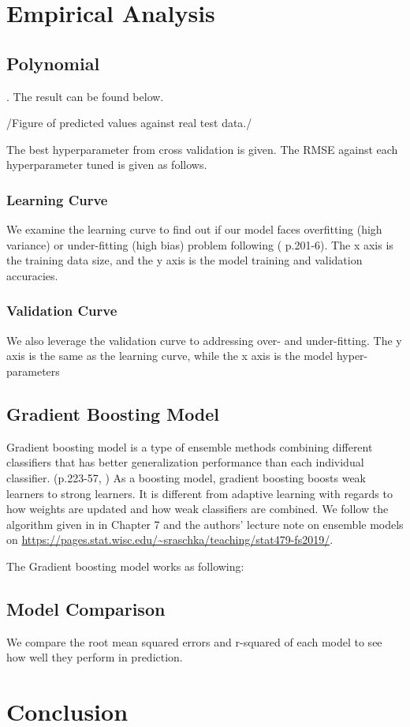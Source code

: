 \documentclass[12pt]{article} %
\begin{document}
\section{Empirical Analysis}
	\subsection{Polynomial}
		.  The result can be found below.
		
		/Figure of predicted values against real test data./
		
		The best hyperparameter from cross validation is given. The RMSE against each hyperparameter tuned is given as follows.
		\subsubsection{Learning Curve}
			We examine the learning curve to find out if our model faces overfitting (high variance) or under-fitting (high bias) problem following (\cite{Raschka2019} p.201-6). The x axis is the training data size, and the y axis is the model training and validation accuracies.
		\subsubsection{Validation Curve}
			We also leverage the validation curve to addressing over- and under-fitting. The y axis is the same as the learning curve, while the x axis is the model hyper-parameters
	\subsection{Gradient Boosting Model}
		Gradient boosting model is a type of ensemble methods combining different classifiers that has better generalization performance than each individual classifier. (p.223-57, \cite{Raschka2019}) As a boosting model, gradient boosting boosts weak learners to strong learners. It is different from adaptive learning with regards to how weights are updated and how weak classifiers are combined. We follow the algorithm given in \cite{raschka2019} in Chapter 7 and the authors' lecture note on ensemble models on \url{https://pages.stat.wisc.edu/~sraschka/teaching/stat479-fs2019/}.\par
		The Gradient boosting model works as following:
	\subsection{Model Comparison}
		We compare the root mean squared errors and r-squared of each model to see how well they perform in prediction. 
	
\section{Conclusion}
	
\newpage	
\footnotesize


\end{document}
